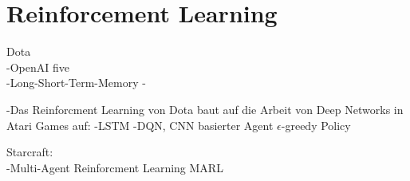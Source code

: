 \section{Reinforcement Learning}

Dota\\
-OpenAI five\\
-Long-Short-Term-Memory
-

-Das Reinforcment Learning von Dota baut auf die Arbeit von Deep Networks in Atari Games auf:
-LSTM
-DQN, CNN basierter Agent  $\epsilon$-greedy Policy


Starcraft:\\
-Multi-Agent Reinforcment Learning MARL







